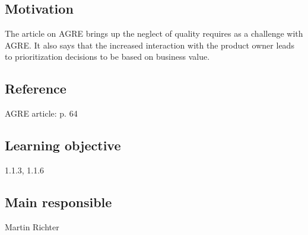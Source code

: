 \documentclass[a4paper]{article}
\begin{document}
\subsection*{Motivation}
The article on AGRE brings up the neglect of quality requires as a challenge with AGRE. It also says that the increased interaction with the product owner leads to prioritization decisions to be based on business value.
\subsection*{Reference}
AGRE article: p. 64
\subsection*{Learning objective}
1.1.3, 1.1.6
\subsection*{Main responsible}
Martin Richter
\end{document}
